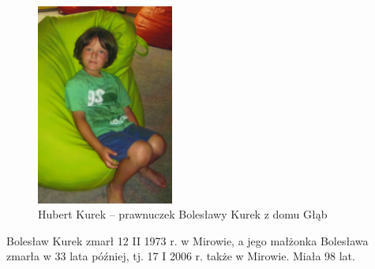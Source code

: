 \begin{figure}[!h]
\begin{center}
\includegraphics[width=0.4\textwidth]{zdjecia/hubert_kurek.jpg}
\caption[Hubert Kurek]{Hubert Kurek -- prawnuczek Bolesławy Kurek z domu Głąb}
\label{rys:hubert_kurek}
\end{center}
\end{figure}

Bolesław Kurek zmarł 12 II 1973 r. w Mirowie, a jego małżonka Bolesława zmarła w 33 lata później, tj. 17 I 2006 r. także w Mirowie. Miała 98 lat.



